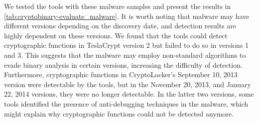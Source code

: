We tested the tools with these malware samples and present the results in \autoref{tab:cryptobinary-evaluate_malware}. It is worth noting that malware may have different versions depending on the discovery date, and detection results are highly dependent on these versions. We found that the tools could detect cryptographic functions in TeslaCrypt version 2 but failed to do so in versions 1 and 3. This suggests that the malware may employ non-standard algorithms to evade binary analysis in certain versions, increasing the difficulty of detection. Furthermore, cryptographic functions in CryptoLocker's September 10, 2013 version were detectable by the tools, but in the November 20, 2013, and January 22, 2014 versions, they were no longer detectable. In the latter two versions, some tools identified the presence of anti-debugging techniques in the malware, which might explain why cryptographic functions could not be detected anymore.



